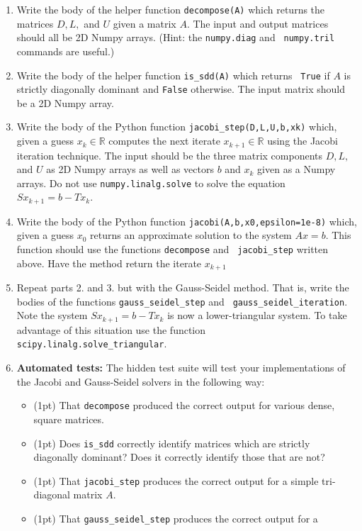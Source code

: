 \documentclass[12pt]{article}
\begin{document}
\begin{enumerate}
\item Write the body of the helper function {\tt decompose(A)} which returns the
  matrices $D, L,$ and $U$ given a matrix $A$. The input and output matrices
  should all be 2D Numpy arrays. (Hint: the {\tt numpy.diag} and {\tt
    numpy.tril} commands are useful.)
\item Write the body of the helper function {\tt is\_sdd(A)} which returns {\tt
    True} if $A$ is strictly diagonally dominant and {\tt False} otherwise. The
  input matrix should be a 2D Numpy array.
\item Write the body of the Python function {\tt jacobi\_step(D,L,U,b,xk)}
  which, given a guess $x_k \in \mathbb{R}$ computes the next iterate $x_{k+1}
  \in \mathbb{R}$ using the Jacobi iteration technique. The input should be the
  three matrix components $D,L,$ and $U$ as 2D Numpy arrays as well as vectors
  $b$ and $x_k$ given as a Numpy arrays. Do not use {\tt numpy.linalg.solve} to
  solve the equation $Sx_{k+1} = b - Tx_k$.
\item Write the body of the Python function {\tt jacobi(A,b,x0,epsilon=1e-8)}
  which, given a guess $x_0$ returns an approximate solution to the system $Ax =
  b$. This function should use the functions {\tt decompose} and {\tt
    jacobi\_step} written above. Have the method return the iterate $x_{k+1}$
\item Repeat parts 2. and 3. but with the Gauss-Seidel method. That is, write
  the bodies of the functions {\tt gauss\_seidel\_step} and {\tt
    gauss\_seidel\_iteration}. Note the system $Sx_{k+1} = b - Tx_k$ is now a
  lower-triangular system. To take advantage of this situation use the function
  {\tt scipy.linalg.solve\_triangular}.
\item {\bf Automated tests:} The hidden test suite will test your
  implementations of the Jacobi and Gauss-Seidel solvers in the following way:
  \begin{itemize}
  \item (1pt) That {\tt decompose} produced the correct output for various
    dense, square matrices.
  \item (1pt) Does {\tt is\_sdd} correctly identify matrices which are strictly
    diagonally dominant? Does it correctly identify those that are not?
  \item (1pt) That {\tt jacobi\_step} produces the correct output for a simple
    tri-diagonal matrix $A$.
  \item (1pt) That {\tt gauss\_seidel\_step} produces the correct output for a

\end{itemize}
\end{enumerate}
\end{document}
